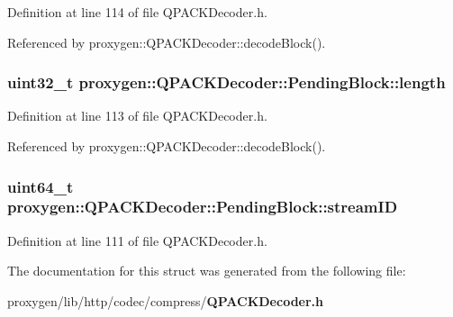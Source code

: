 Definition at line 114 of file Q\+P\+A\+C\+K\+Decoder.\+h.



Referenced by proxygen\+::\+Q\+P\+A\+C\+K\+Decoder\+::decode\+Block().

\subsubsection[{length}]{\setlength{\rightskip}{0pt plus 5cm}uint32\+\_\+t proxygen\+::\+Q\+P\+A\+C\+K\+Decoder\+::\+Pending\+Block\+::length}\label{structproxygen_1_1QPACKDecoder_1_1PendingBlock_a2155724c8f6188e1e43236bdce4d183a}


Definition at line 113 of file Q\+P\+A\+C\+K\+Decoder.\+h.



Referenced by proxygen\+::\+Q\+P\+A\+C\+K\+Decoder\+::decode\+Block().

\subsubsection[{stream\+ID}]{\setlength{\rightskip}{0pt plus 5cm}uint64\+\_\+t proxygen\+::\+Q\+P\+A\+C\+K\+Decoder\+::\+Pending\+Block\+::stream\+ID}\label{structproxygen_1_1QPACKDecoder_1_1PendingBlock_a56252264e66c4d4cf87f6e759b3ecd69}


Definition at line 111 of file Q\+P\+A\+C\+K\+Decoder.\+h.



The documentation for this struct was generated from the following file\+:\begin{DoxyCompactItemize}
\item 
proxygen/lib/http/codec/compress/{\bf Q\+P\+A\+C\+K\+Decoder.\+h}\end{DoxyCompactItemize}
